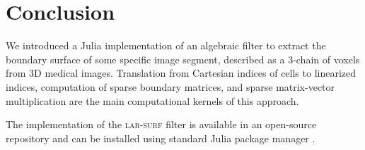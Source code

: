 
\section{Conclusion}\label{sec:conclusion}




We introduced a Julia implementation of an algebraic filter to extract the
boundary surface of some specific image segment, described as a 3-chain of voxels from 3D medical images. Translation from
Cartesian indices of cells to linearized indices, computation of sparse boundary matrices, and 
sparse matrix-vector multiplication are the main computational kernels of this approach. 

The implementation of the \textsc{lar-surf} filter is available in an open-source repository and can be installed using standard Julia package manager \cite{larsurf-github}.

